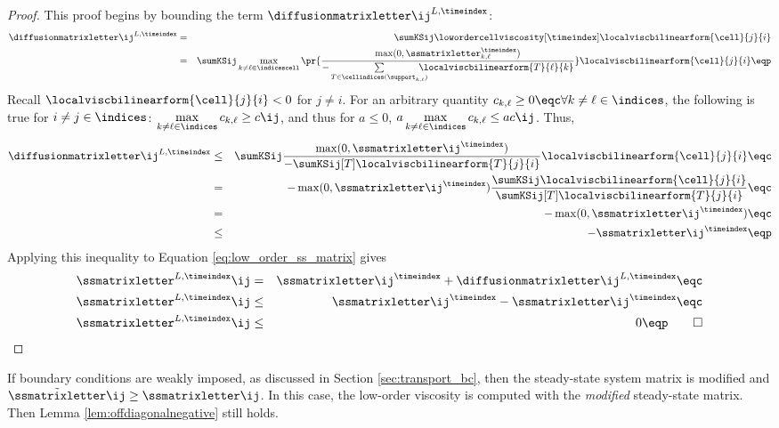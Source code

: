 \begin{proof}
This proof begins by bounding the term $\diffusionmatrixletter\ij^{L,\timeindex}$:
\begin{eqnarray*}
   \diffusionmatrixletter\ij^{L,\timeindex}
   & = &
     \sumKSij\lowordercellviscosity[\timeindex]
   \localviscbilinearform{\cell}{j}{i}\\
   & = & \sumKSij\max\limits_{k\ne \ell\in \indicescell}
     \pr{\frac{\max(0,\ssmatrixletter_{k,\ell}^\timeindex)}
       {-\sum\limits_{T\in\cellindices(\support_{k,\ell})}
       \mkern-20mu\localviscbilinearform{T}{\ell}{k}}}
     \localviscbilinearform{\cell}{j}{i} \eqp
\end{eqnarray*}
Recall $\localviscbilinearform{\cell}{j}{i} < 0$ for $j\ne i$.
For an arbitrary quantity $c_{k,\ell} \geq 0 \eqc \forall k\ne\ell\in\indices$,
the following is true for $i\ne j\in\indices$:
$\max\limits_{k\ne\ell\in\indices}c_{k,\ell} \geq c\ij$, and thus for $a\leq 0$,
$a\max\limits_{k\ne\ell\in\indices}c_{k,\ell} \leq a c\ij$.
Thus,
\begin{eqnarray*}
   \diffusionmatrixletter\ij^{L,\timeindex} & \le &
     \sumKSij \frac{\max(0,\ssmatrixletter\ij^\timeindex)}
   {-\sumKSij[T]\localviscbilinearform{T}{j}{i}}
   \localviscbilinearform{\cell}{j}{i} \eqc\\
   &  =  & -\max(0,\ssmatrixletter\ij^\timeindex)
     \frac{\sumKSij\localviscbilinearform{\cell}{j}{i}}
     {\sumKSij[T]\localviscbilinearform{T}{j}{i}} \eqc\\
   &  =  & -\max(0,\ssmatrixletter\ij^\timeindex) \eqc\\
   & \le & -\ssmatrixletter\ij^\timeindex \eqp
\end{eqnarray*}
Applying this inequality to Equation \eqref{eq:low_order_ss_matrix} gives
\begin{eqnarray*}
  \ssmatrixletter^{L,\timeindex}\ij &  =  &
    \ssmatrixletter\ij^\timeindex + \diffusionmatrixletter\ij^{L,\timeindex}
    \eqc\\
  \ssmatrixletter^{L,\timeindex}\ij & \le &
    \ssmatrixletter\ij^\timeindex - \ssmatrixletter\ij^\timeindex
    \eqc\\
  \ssmatrixletter^{L,\timeindex}\ij & \le & 0 \eqp \qed
\end{eqnarray*}
\end{proof}
\begin{remark}
If boundary conditions are weakly imposed, as discussed in Section
\ref{sec:transport_bc}, then the steady-state system matrix is modified
and $\tilde{\ssmatrixletter}\ij \geq \ssmatrixletter\ij$. In this case, the low-order
viscosity is computed with the \emph{modified} steady-state matrix. Then
Lemma \ref{lem:offdiagonalnegative} still holds.
\end{remark}
